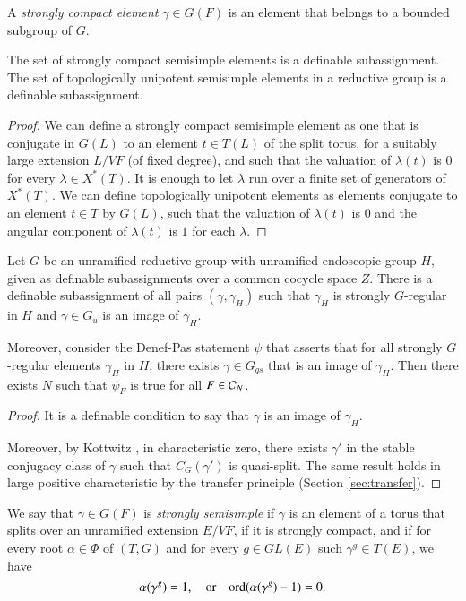 A {\it strongly compact element} $\gamma\in G(F)$ is an element that
belongs to a bounded subgroup of $G$.

\begin{lemma} 
The set of strongly
  compact semisimple elements is a definable subassignment.
  The set of topologically unipotent semisimple elements in a
  reductive group is a definable subassignment.  
\end{lemma}

\begin{proof} We can define a strongly compact semisimple element as
  one that is conjugate in $G(L)$ to an element $t\in T(L)$ of the
  split torus, for a suitably large extension $L/VF$
  (of fixed degree), and such that the valuation of $\lambda(t)$ is
  $0$ for every $\lambda\in X^*(T)$.  It is enough to let $\lambda$ run
  over a finite set of generators of $X^*(T)$.  We can define topologically
  unipotent elements as elements conjugate to an element $t\in T$ by
  $G(L)$, such that the valuation of $\lambda(t)$ is $0$ and the angular
  component of $\lambda(t)$ is $1$ for each $\lambda$.
\end{proof}


\begin{lemma} 
  Let $G$ be an unramified reductive group with unramified endoscopic
  group $H$, given as definable subassignments over a common cocycle
  space $Z$.  There is a definable subassignment of all pairs
  $(\gamma,\gamma_H)$ such that $\gamma_H$ is strongly $G$-regular in
  $H$ and $\gamma\in G_u$ is an image of $\gamma_H$.

  Moreover, consider the
  Denef-Pas statement $\psi$ that asserts that for all strongly
  $G$-regular elements $\gamma_H$ in $H$, there exists
  $\gamma\in G_{qs}$ that is an image of $\gamma_H$.  Then there
  exists $N$ such that $\psi_F$ is true for all $F\in\mathcal C_N$.
\end{lemma}

\begin{proof}  It is a definable condition to say that $\gamma$ is an
  image of $\gamma_H$.

  Moreover, by Kottwitz \cite[3.3]{kottwitz1982rational}, in
  characteristic zero, there exists $\gamma'$ in the stable conjugacy
  class of $\gamma$ such that $C_G(\gamma')$ is quasi-split.  The same
  result holds in large positive characteristic by the transfer
  principle (Section \ref{sec:transfer}).
\end{proof}

\begin{definition} 
  We say that $\gamma\in G(F)$ is {\it strongly semisimple} if $\gamma$
  is an element of a torus that splits over an unramified extension
  $E/VF$, if it is strongly compact, and if for every root $\alpha\in
  \Phi$ of $(T,G)$ and for every $g\in GL(E)$ such $\gamma^g\in T(E)$,
  we have
  \[
  \alpha(\gamma^g) = 1,\quad\text{or}
\quad {\operatorname{ord}}(\alpha(\gamma^g)-1)=0.
  \]
 \end{definition}

